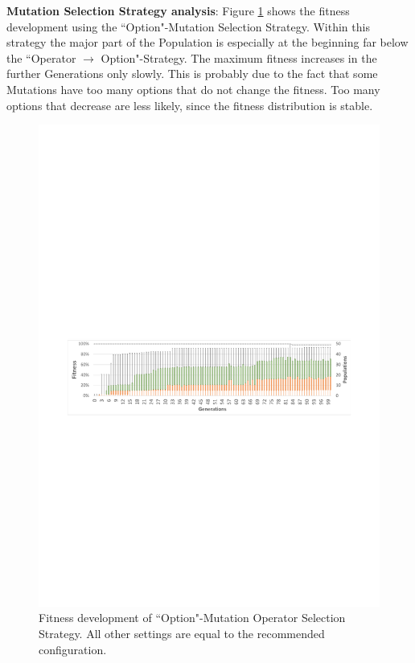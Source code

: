  
\textbf{Mutation Selection Strategy analysis}: Figure \ref{figConfigurationComparison_BestWithOption} shows the fitness development using the ``Option"-Mutation Selection Strategy. Within this strategy the major part of the \gls{Population} is especially at the beginning far below the ``Operator $\rightarrow$ Option"-Strategy. The maximum fitness increases in the further \glspl{Generation} only slowly. This is probably due to the fact that some \glspl{Mutation} have too many options that do not change the fitness. Too many options that decrease are less likely, since the fitness distribution is stable.

\begin{figure}[!ht]
	\centering
	\includegraphics[scale=0.8, trim=1.5cm 11.5cm 1.5cm 13cm, clip=true]{Images/ConfigurationComparison_BestWithOption.pdf} 
	\caption{Fitness development of ``Option"-Mutation Operator Selection Strategy. All other settings are equal to the recommended configuration.}
	\label{figConfigurationComparison_BestWithOption}
\end{figure}


